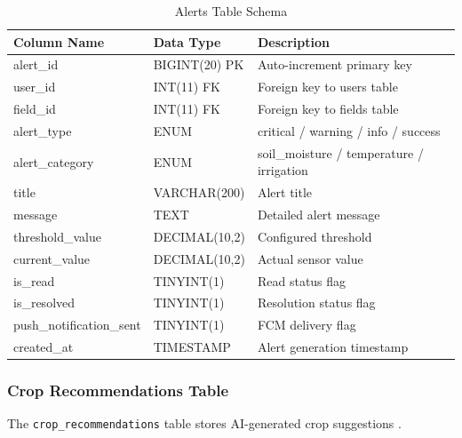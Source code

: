 \begin{table}[H]
\centering
\small
\begin{tabular}{|l|l|p{5.5cm}|}
\hline
\textbf{Column Name} & \textbf{Data Type} & \textbf{Description} 
\\ \hline
alert\_id & BIGINT(20) PK & Auto-increment primary key \\ \hline
user\_id & INT(11) FK & Foreign key to users table \\ \hline
field\_id & INT(11) FK & Foreign key to fields table \\ \hline
alert\_type & ENUM & critical / warning / info / success \\ \hline
alert\_category & ENUM & soil\_moisture / temperature / irrigation 
\\ \hline
title & VARCHAR(200) & Alert title \\ \hline
message & TEXT & Detailed alert message \\ \hline
threshold\_value & DECIMAL(10,2) & Configured threshold \\ \hline
current\_value & DECIMAL(10,2) & Actual sensor value \\ \hline
is\_read & TINYINT(1) & Read status flag \\ \hline
is\_resolved & TINYINT(1) & Resolution status flag \\ \hline
push\_notification\_sent & TINYINT(1) & FCM delivery flag \\ \hline
created\_at & TIMESTAMP & Alert generation timestamp \\ \hline
\end{tabular}
\caption{Alerts Table Schema}
\label{tab:alerts-schema}
\end{table}

\subsubsection{Crop Recommendations Table}
The \texttt{crop\_recommendations} table stores AI-generated crop 
suggestions \cite{ali2025soilml, musanase2023data}.

